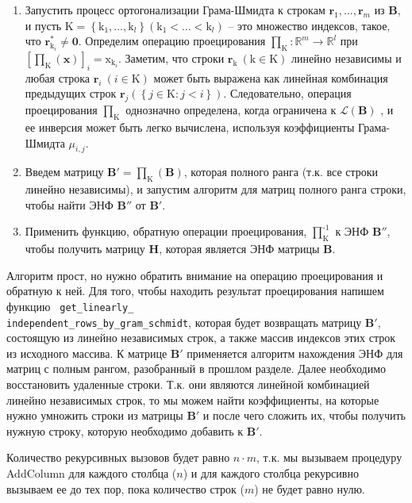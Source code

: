 \begin{enumerate}
\item Запустить процесс ортогонализации Грама-Шмидта к строкам $ \mathbf{r}_1, \ldots, \mathbf{r}_m $ из $ \mathbf{B} $, и пусть $ \mathrm{K}=\left\{\mathrm{k}_1, \ldots, \mathrm{k}_l \right\}(\mathrm{k}_1< \ldots <\mathrm{k}_l) $ – это множество индексов, такое, что $ \mathbf{r}_{\mathrm{k}_i}^\ast \neq \mathbf{0} $. Определим операцию проецирования $ \prod_\mathrm{K}:\mathbb{R}^m \rightarrow \mathbb{R}^l $ при $ [\prod_\mathrm{K}(\mathbf{x})]_i = \mathrm{x}_{\mathrm{k}_i} $. Заметим, что строки $ \mathbf{r}_\mathrm{k}\ (\mathrm{k} \in \mathrm{K}) $ линейно независимы и любая строка $ \mathbf{r}_i\ (i \in \mathrm{K}) $ может быть выражена как линейная комбинация предыдущих строк $ \mathbf{r}_j\left(\left\{j \in \mathrm{K}:j<i \right\}\right) $. Следовательно, операция проецирования $ \prod_\mathrm{K} $ однозначно определена, когда ограничена к $ \mathcal{L}(\mathbf{B})$ , и ее инверсия может быть легко вычислена, используя коэффициенты Грама-Шмидта $ \mu_{i,j} $.
\item Введем матрицу $ \mathbf{B}'=\prod_\mathrm{K}(\mathbf{B}) $, которая полного ранга (т.к. все строки линейно независимы), и запустим алгоритм для матриц полного ранга строки, чтобы найти ЭНФ $ \mathbf{B}'' $ от $ \mathbf{B}' $.
\item Применить функцию, обратную операции проецирования, $ \prod_\mathrm{K}^{\text{-}1} $ к ЭНФ $ \mathbf{B}'' $, чтобы получить матрицу $ \mathbf{H} $, которая является ЭНФ матрицы $ \mathbf{B} $.
\end{enumerate}

Алгоритм прост, но нужно обратить внимание на операцию проецирования и обратную к ней. Для того, чтобы находить результат проецирования напишем функцию \verb! get_linearly_! \\ \verb!independent_rows_by_gram_schmidt!, которая будет возвращать матрицу $ \mathbf{B}' $, состоящую из линейно независимых строк, а также массив индексов этих строк из исходного массива. К матрице $ \mathbf{B}' $ применяется алгоритм нахождения ЭНФ для матриц с полным рангом, разобранный в прошлом разделе. Далее необходимо восстановить удаленные строки. Т.к. они являются линейной комбинацией линейно независимых строк, то мы можем найти коэффициенты, на которые нужно умножить строки из матрицы $ \mathbf{B}' $ и после чего сложить их, чтобы получить нужную строку, которую необходимо добавить к $ \mathbf{B}' $.

Количество рекурсивных вызовов будет равно $ n \cdot m $, т.к. мы вызываем процедуру AddColumn для каждого столбца ($ n $) и для каждого столбца рекурсивно вызываем ее до тех пор, пока количество строк ($ m $) не будет равно нулю.

